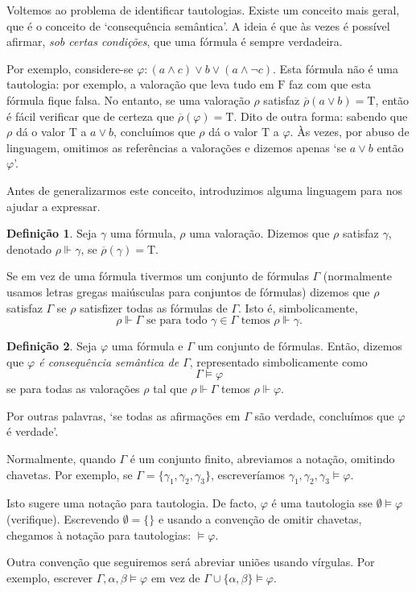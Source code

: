 \documentclass{report}
\theoremstyle{definition}
\newtheorem*{definicao*}{Definição}
\theoremstyle{remark}
\newcommand{\lt}{\mathrm{T}}
\newcommand{\lf}{\mathrm{F}}
\begin{document}
	Voltemos ao problema de identificar tautologias. Existe um conceito mais geral, que é o conceito de `consequência semântica'. A ideia é que às vezes é possível afirmar, \emph{sob certas condições}, que uma fórmula é sempre verdadeira.
	
	Por exemplo, considere-se $\varphi : (a \land c) \lor b \lor (a \land \neg c)$. Esta fórmula não é uma tautologia: por exemplo, a valoração que leva tudo em $\lf$ faz com que esta fórmula fique falsa. No entanto, se uma valoração $\rho$ satisfaz $\overline\rho(a \lor b) = \lt$, então é fácil verificar que de certeza que $\overline\rho(\varphi) = \lt$. Dito de outra forma: sabendo que $\rho$ dá o valor $\lt$ a $a \lor b$, concluímos que $\rho$ dá o valor $\lt$ a $\varphi$. Às vezes, por abuso de linguagem, omitimos as referências a valorações e dizemos apenas `se $a \lor b$ então $\varphi$'.
	
	Antes de generalizarmos este conceito, introduzimos alguma linguagem para nos ajudar a expressar.
	
	\begin{definicao*}
	Seja $\gamma$ uma fórmula, $\rho$ uma valoração. Dizemos que $\rho$ satisfaz $\gamma$, denotado $\rho \Vdash \gamma$, se $\overline\rho(\gamma) = \lt$.
	
	Se em vez de uma fórmula tivermos um conjunto de fórmulas $\Gamma$ (normalmente usamos letras gregas maiúsculas para conjuntos de fórmulas) dizemos que $\rho$ satisfaz $\Gamma$ se $\rho$ satisfizer todas as fórmulas de $\Gamma$. Isto é, simbolicamente,
	\[\rho \Vdash \Gamma \text{ se para todo $\gamma \in \Gamma$ temos } \rho \Vdash \gamma.\]
	\end{definicao*}
	
	\begin{definicao*}
	Seja $\varphi$ uma fórmula e $\Gamma$ um conjunto de fórmulas. Então, dizemos que \emph{$\varphi$ é consequência semântica de $\Gamma$}, representado simbolicamente como
	\[\Gamma \vDash \varphi\]
	se para todas as valorações $\rho$ tal que $\rho \Vdash \Gamma$ temos $\rho \Vdash \varphi$.
	
	Por outras palavras, `se todas as afirmações em $\Gamma$ são verdade, concluímos que $\varphi$ é verdade'.
	
	Normalmente, quando $\Gamma$ é um conjunto finito, abreviamos a notação, omitindo chavetas. Por exemplo, se $\Gamma = \{\gamma_1, \gamma_2, \gamma_3\}$, escreveríamos $\gamma_1, \gamma_2, \gamma_3 \vDash \varphi$.\label{convencao:consequencia}
	
	Isto sugere uma notação para tautologia. De facto, $\varphi$ é uma tautologia sse $\emptyset \vDash \varphi$ (verifique). Escrevendo $\emptyset = \{\}$ e usando a convenção de omitir chavetas, chegamos à notação para tautologias: $\vDash \varphi$.
	
	Outra convenção que seguiremos será abreviar uniões usando vírgulas. Por exemplo, escrever $\Gamma, \alpha, \beta \vDash \varphi$ em vez de $\Gamma \cup \{\alpha, \beta\} \vDash \varphi$.
	\end{definicao*}
	
\end{document}
